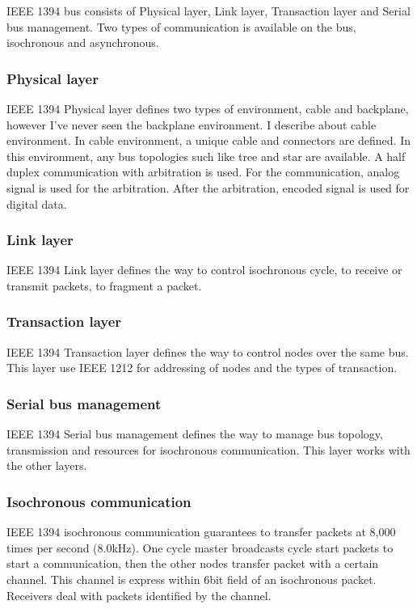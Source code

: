 \documentclass[onecolumn]{article}
\begin{document}
IEEE 1394 bus consists of Physical layer, Link layer, Transaction layer and Serial bus management. Two types of communication is available on the bus, isochronous and asynchronous.

\subsubsection{Physical layer}
IEEE 1394 Physical layer defines two types of environment, cable and backplane, however I've never seen the backplane environment. I describe about cable environment. In cable environment, a unique cable and connectors are defined. In this environment, any bus topologies such like tree and star are available. A half duplex communication with arbitration is used. For the communication, analog signal is used for the arbitration. After the arbitration, encoded signal is used for digital data.


\subsubsection{Link layer}
IEEE 1394 Link layer defines the way to control isochronous cycle, to receive or transmit packets, to fragment a packet.


\subsubsection{Transaction layer}
IEEE 1394 Transaction layer defines the way to control nodes over the same bus. This layer use IEEE 1212 for addressing of nodes and the types of transaction.

\subsubsection{Serial bus management}
IEEE 1394 Serial bus management defines the way to manage bus topology, transmission and resources for isochronous communication. This layer works with the other layers.

\subsubsection{Isochronous communication}
IEEE 1394 isochronous communication guarantees to transfer packets at 8,000 times per second (8.0kHz). One cycle master broadcasts cycle start packets to start a communication, then the other nodes transfer packet with a certain channel. This channel is express within 6bit field of an isochronous packet. Receivers deal with packets identified by the channel.
\end{document}
